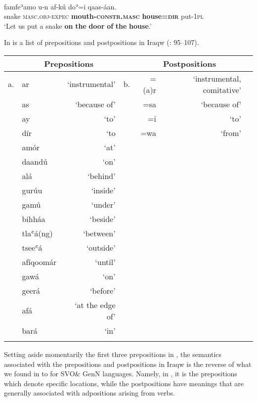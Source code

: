 \documentclass[output=paper]{langsci/langscibook}
\begin{document}
\ea\label{ex:dryer:}
\\
\gll famfeʾamo  u-n  af-kú  doʾ=i  qaas-áan.\\
       snake  \textsc{masc.obj-expec}  \textbf{mouth-\textsc{constr.masc}}  \textbf{house=\textsc{dir}}  put-\textsc{1pl}  \\
\glt ‘Let us put a snake \textbf{on} \textbf{the} \textbf{door} \textbf{of} \textbf{the} \textbf{house}.’
\z

In  is a list of prepositions and postpositions in Iraqw (\citealt{Mous1993}: 95–107).


\begin{table}
\begin{tabularx}{\textwidth}{Xlrrrrr}
\lsptoprule
 & \multicolumn{2}{c}{\bfseries Prepositions} &  & \multicolumn{2}{c}{\bfseries Postpositions}\\
\midrule
a. & ar & ‘instrumental’ & b. & =(a)r & ‘instrumental, comitative’\\
 & as & ‘because of’ &  & =sa & ‘because of’\\
 & ay & ‘to’ &  & =i & ‘to’\\
 & dír & ‘to &  & =wa & ‘from’\\
 & amór & ‘at’ &  &  & \\
 & daandú & ‘on’ &  &  & \\
 & alá & ‘behind’ &  &  & \\
 & gurúu & ‘inside’ &  &  & \\
 & gamú & ‘under’ &  &  & \\
 & bihháa & ‘beside’ &  &  & \\
 & tlaʿá(ng) & ‘between’ &  &  & \\
 & tseeʿá & ‘outside’ &  &  & \\
 & afíqoomár & ‘until’ &  &  & \\
 & gawá & ‘on’ &  &  & \\
 & geerá & ‘before’ &  &  & \\
 & afá & ‘at the edge of’ &  &  & \\
 & bará & ‘in’ &  &  & \\
\lspbottomrule
\end{tabularx}
\end{table}

Setting aside momentarily the first three prepositions in , the semantics associated with the prepositions and postpositions in Iraqw is the reverse of what we found in  to  for SVO\& GenN languages. Namely, in , it is the prepositions which denote specific locations, while the postpositions have meanings that are generally associated with adpositions arising from verbs.
\end{document}

